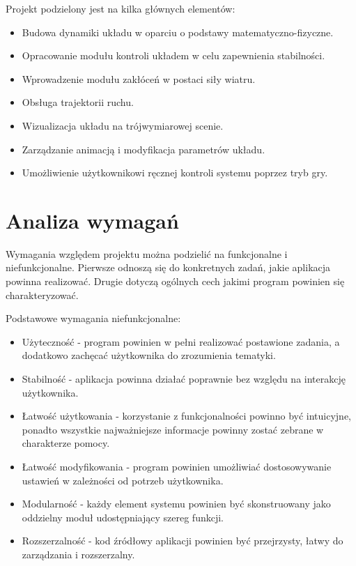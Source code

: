 \documentclass[12pt, oneside]{report}
\theoremstyle{definition}
\begin{document}
Projekt podzielony jest na kilka głównych elementów:
\begin{itemize}
\item Budowa dynamiki układu w oparciu o podstawy matematyczno-fizyczne.
\item Opracowanie modułu kontroli układem w celu zapewnienia stabilności.
\item Wprowadzenie modułu zakłóceń w postaci siły wiatru.
\item Obsługa trajektorii ruchu.
\item Wizualizacja układu na trójwymiarowej scenie.
\item Zarządzanie animacją i modyfikacja parametrów układu.
\item Umożliwienie użytkownikowi ręcznej kontroli systemu poprzez tryb gry.
\end{itemize}

\section{Analiza wymagań}
Wymagania względem projektu można podzielić na funkcjonalne i niefunkcjonalne. Pierwsze odnoszą się do konkretnych zadań, jakie aplikacja powinna realizować. Drugie dotyczą ogólnych cech jakimi program powinien się charakteryzować.

Podstawowe wymagania niefunkcjonalne:
\begin{itemize}
\item Użyteczność - program powinien w pełni realizować postawione zadania, a dodatkowo zachęcać użytkownika do zrozumienia tematyki.
\item Stabilność - aplikacja powinna działać poprawnie bez względu na interakcję użytkownika.
\item Łatwość użytkowania - korzystanie z funkcjonalności powinno być intuicyjne, ponadto wszystkie najważniejsze informacje powinny zostać zebrane w charakterze pomocy.
\item Łatwość modyfikowania - program powinien umożliwiać dostosowywanie ustawień w zależności od potrzeb użytkownika. 
\item Modularność - każdy element systemu powinien być skonstruowany jako oddzielny moduł udostępniający szereg funkcji.
\item Rozszerzalność - kod źródłowy aplikacji powinien być przejrzysty, łatwy do zarządzania i rozszerzalny.
\end{itemize}
\end{document}
